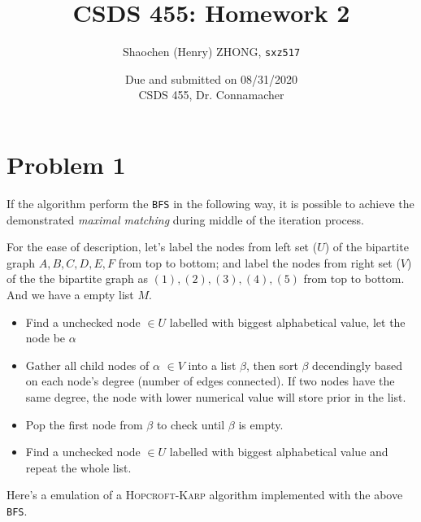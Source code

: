 \documentclass[11pt]{article}
\newcommand{\ilc}{\texttt}
\begin{document}
\title{\textbf{CSDS 455: Homework 2}}

\author{Shaochen (Henry) ZHONG, \ilc{sxz517}}
\date{Due and submitted on 08/31/2020 \\ CSDS 455, Dr. Connamacher}
\maketitle

\section{Problem 1}

If the algorithm perform the \ilc{BFS} in the following way, it is possible to achieve the demonstrated \textit{maximal matching} during middle of the iteration process.

For the ease of description, let's label the nodes from left set ($U$) of the bipartite graph $A, B, C, D, E, F$ from top to bottom; and label the nodes from right set ($V$) of the the bipartite graph as $(1), (2), (3), (4), (5)$ from top to bottom. And we have a empty list $M$.

\begin{itemize}
    \item Find a unchecked node $\in U$ labelled with biggest alphabetical value, let the node be $\alpha$
    \item Gather all child nodes of $\alpha$ $\in V$ into a list $\beta$, then sort $\beta$ decendingly based on each node's degree (number of edges connected). If two nodes have the same degree, the node with lower numerical value will store prior in the list.
    \item Pop the first node from $\beta$ to check until $\beta$ is empty.
    \item Find a unchecked node $\in U$ labelled with biggest alphabetical value and repeat the whole list.
\end{itemize}

Here's a emulation of a \textsc{Hopcroft-Karp} algorithm implemented with the above \ilc{BFS}.
\end{document}
